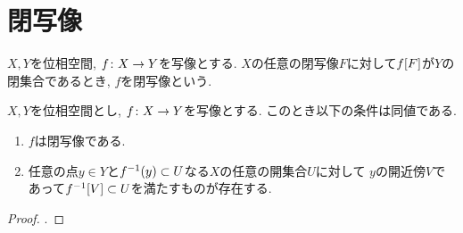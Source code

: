 \documentclass[uplatex, dvipdfmx, a4paper, 12pt, class=jsbook, crop=false]{standalone}
\begin{document}
\section{閉写像}
\label{sec:closed-maps}

\begin{definition}
	$ X, Y $を位相空間, $ f\colon X\to Y $を写像とする.
	$ X $の任意の閉写像$ F $に対して$ \mapset{f}{F} $が$ Y $の閉集合であるとき,
    $ f $を閉写像という.
\end{definition}

\begin{proposition}
    \label{c00001}
    $ X, Y $を位相空間とし, $ f\colon X\to Y $を写像とする.
    このとき以下の条件は同値である.
    \begin{enumerate}
        \item $ f $は閉写像である.
        \item 任意の点$ y \in Y $と$ \mapinvpt{f}{y} \subset U $なる$ X $の任意の開集合$ U $に対して
        $ y $の開近傍$ V $であって$ \mapinvset{f}{V} \subset U $を満たすものが存在する.
    \end{enumerate}
\end{proposition}

\begin{proof}
    \WIP.
\end{proof}
\end{document}
